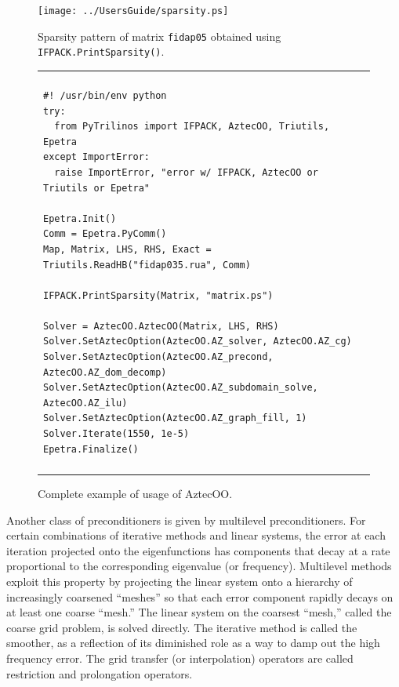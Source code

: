 \documentclass[10pt,relax]{SANDreport}
\begin{document}
\begin{figure}
\begin{center}
\texttt{[image: ../UsersGuide/sparsity.ps]}
\caption{Sparsity pattern of matrix {\tt fidap05} obtained using {\tt
  IFPACK.PrintSparsity()}.}
\label{fig:sparsity}
\end{center}
\end{figure}

\begin{figure}
\begin{center}
\begin{tabular}{| p{12cm} |}
\hline
\\
\footnotesize
\begin{minipage}{11.5cm}
\begin{verbatim}
#! /usr/bin/env python
try:
  from PyTrilinos import IFPACK, AztecOO, Triutils, Epetra
except ImportError:
  raise ImportError, "error w/ IFPACK, AztecOO or Triutils or Epetra"

Epetra.Init()
Comm = Epetra.PyComm()
Map, Matrix, LHS, RHS, Exact = Triutils.ReadHB("fidap035.rua", Comm)

IFPACK.PrintSparsity(Matrix, "matrix.ps")

Solver = AztecOO.AztecOO(Matrix, LHS, RHS)
Solver.SetAztecOption(AztecOO.AZ_solver, AztecOO.AZ_cg)
Solver.SetAztecOption(AztecOO.AZ_precond, AztecOO.AZ_dom_decomp)
Solver.SetAztecOption(AztecOO.AZ_subdomain_solve, AztecOO.AZ_ilu)
Solver.SetAztecOption(AztecOO.AZ_graph_fill, 1)
Solver.Iterate(1550, 1e-5)
Epetra.Finalize()
\end{verbatim}
\end{minipage}
\\
\\
\hline
\end{tabular}
\caption{Complete example of usage of AztecOO.}
\label{fig:aztecoo}
\end{center}
\end{figure}

\medskip

Another class of preconditioners is given by multilevel
preconditioners.  
For certain combinations of iterative methods and
linear systems, the error at each iteration projected onto the
eigenfunctions has components that decay at a rate proportional to the
corresponding eigenvalue (or frequency).  Multilevel methods exploit
this property \cite{Briggs} by projecting the linear system onto a
hierarchy of increasingly coarsened ``meshes'' so that each error
component rapidly decays on at least one coarse ``mesh.''  The linear
system on the coarsest ``mesh,'' called the coarse grid problem, is
solved directly.  The iterative method is called the smoother, as a
reflection of its diminished role as a way to damp out the high
frequency error.  The grid transfer (or interpolation) operators are
called restriction and prolongation
operators.
\end{document}
